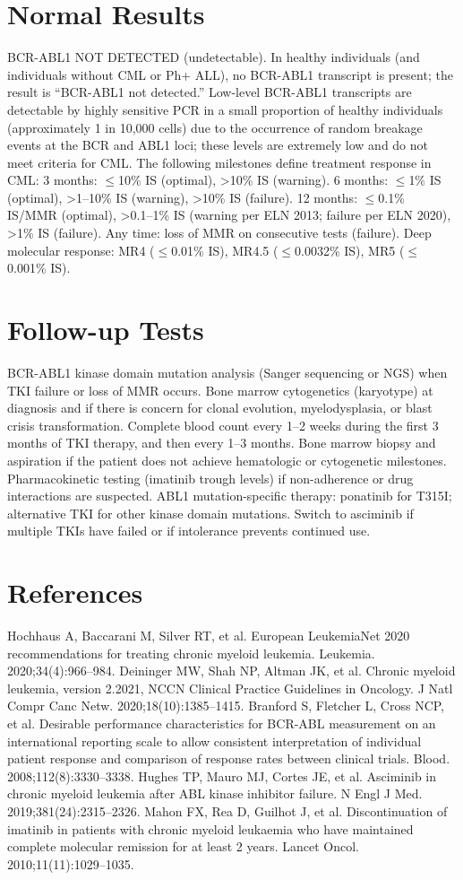 \section*{Normal Results}
BCR-ABL1 NOT DETECTED (undetectable). In healthy individuals (and individuals without CML or Ph+ ALL), no BCR-ABL1 transcript is present; the result is ``BCR-ABL1 not detected.'' Low-level BCR-ABL1 transcripts are detectable by highly sensitive PCR in a small proportion of healthy individuals (approximately 1 in 10,000 cells) due to the occurrence of random breakage events at the BCR and ABL1 loci; these levels are extremely low and do not meet criteria for CML. The following milestones define treatment response in CML: 3 months: $\leq$10\% IS (optimal), >10\% IS (warning). 6 months: $\leq$1\% IS (optimal), >1--10\% IS (warning), >10\% IS (failure). 12 months: $\leq$0.1\% IS/MMR (optimal), >0.1--1\% IS (warning per ELN 2013; failure per ELN 2020), >1\% IS (failure). Any time: loss of MMR on consecutive tests (failure). Deep molecular response: MR4 ($\leq$0.01\% IS), MR4.5 ($\leq$0.0032\% IS), MR5 ($\leq$0.001\% IS).

\section*{Follow-up Tests}
BCR-ABL1 kinase domain mutation analysis (Sanger sequencing or NGS) when TKI failure or loss of MMR occurs. Bone marrow cytogenetics (karyotype) at diagnosis and if there is concern for clonal evolution, myelodysplasia, or blast crisis transformation. Complete blood count every 1--2 weeks during the first 3 months of TKI therapy, and then every 1--3 months. Bone marrow biopsy and aspiration if the patient does not achieve hematologic or cytogenetic milestones. Pharmacokinetic testing (imatinib trough levels) if non-adherence or drug interactions are suspected. ABL1 mutation-specific therapy: ponatinib for T315I; alternative TKI for other kinase domain mutations. Switch to asciminib if multiple TKIs have failed or if intolerance prevents continued use.

\section*{References}
Hochhaus A, Baccarani M, Silver RT, et al. European LeukemiaNet 2020 recommendations for treating chronic myeloid leukemia. Leukemia. 2020;34(4):966--984. Deininger MW, Shah NP, Altman JK, et al. Chronic myeloid leukemia, version 2.2021, NCCN Clinical Practice Guidelines in Oncology. J Natl Compr Canc Netw. 2020;18(10):1385--1415. Branford S, Fletcher L, Cross NCP, et al. Desirable performance characteristics for BCR-ABL measurement on an international reporting scale to allow consistent interpretation of individual patient response and comparison of response rates between clinical trials. Blood. 2008;112(8):3330--3338. Hughes TP, Mauro MJ, Cortes JE, et al. Asciminib in chronic myeloid leukemia after ABL kinase inhibitor failure. N Engl J Med. 2019;381(24):2315--2326. Mahon FX, Rea D, Guilhot J, et al. Discontinuation of imatinib in patients with chronic myeloid leukaemia who have maintained complete molecular remission for at least 2 years. Lancet Oncol. 2010;11(11):1029--1035.

\clearpage
